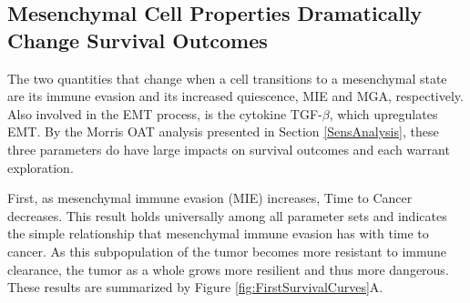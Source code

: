 \documentclass{article}
\begin{document}
\subsection{Mesenchymal Cell Properties Dramatically Change Survival Outcomes}\label{MesPars}
The two quantities that change when a cell transitions to a mesenchymal state are its immune evasion and its increased quiescence, MIE and MGA, respectively.
Also involved in the EMT process, is the cytokine TGF-$\beta$, which upregulates EMT.
By the Morris OAT analysis presented in Section \ref{SensAnalysis}, these three parameters do have large impacts on survival outcomes and each warrant exploration.

First, as mesenchymal immune evasion (MIE) increases, Time to Cancer decreases.
This result holds universally among all parameter sets and indicates the simple relationship that mesenchymal immune evasion has with time to cancer.
As this subpopulation of the tumor becomes more resistant to immune clearance, the tumor as a whole grows more resilient and thus more dangerous.
These results are summarized by Figure \ref{fig:FirstSurvivalCurves}A.
\end{document}

